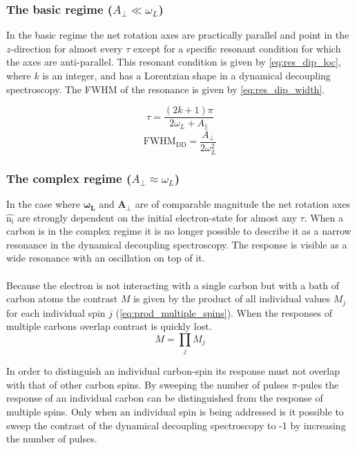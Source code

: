 \subsubsection{The basic regime ($A_\perp \ll \omega_L$)}
In the basic regime the net rotation axes are practically parallel and point in the $z$-direction for almost every $\tau$ except for a specific resonant condition for which the axes are anti-parallel.
This resonant condition is given by \cref{eq:res_dip_loc}, where $k$ is an integer, and has a Lorentzian shape in a dynamical decoupling spectroscopy.
The FWHM of the resonance is given by \cref{eq:res_dip_width}.

 \begin{equation}
\tau = \frac{(2k+1)\pi}{2 \omega_L + A_\parallel}
\label{eq:res_dip_loc}
\end{equation}
 \begin{equation}
\mathrm{FWHM_{DD}} = \frac{A_\perp}{2 \omega_L^2}
\label{eq:res_dip_width}
\end{equation}

\subsubsection{The complex regime ($A_\perp \approx \omega_L$)}

In the case where $\bm{\omega_L}$ and $\bm{A_\perp}$ are of comparable magnitude the net rotation axes $\bm{\hat{\mathrm{n_i}}}$ are strongly dependent on the initial electron-state for almost any $\tau$.
When a carbon is in the complex regime it is no longer possible to describe it as a narrow resonance in the dynamical decoupling spectroscopy.
The response is visible as a wide resonance with an oscillation on top of it.

\paragraph{}
Because the electron is not interacting with a single carbon but with a bath of carbon atoms the contrast $M$ is given by the product of all individual values $M_j$ for each individual spin $j$ (\cref{eq:prod_multiple_spins}).
When the responses of multiple carbons overlap contrast is quickly lost.
\begin{equation}
\label{eq:prod_multiple_spins}
    M = \prod_{j}{M_j}
\end{equation}

In order to distinguish an individual carbon-spin its response must not overlap with that of other carbon spins.
By sweeping the number of pulses $\pi$-pules the response of an individual carbon can be distinguished from the response of multiple spins.
Only when an individual spin is being addressed is it possible to sweep the contrast of the dynamical decoupling spectroscopy to -1 by increasing the number of pulses.

